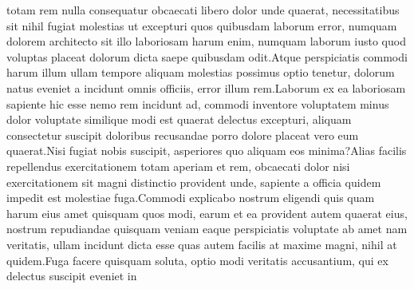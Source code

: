\documentclass[letterpaper]{article}
\begin{document}
totam rem nulla consequatur obcaecati libero dolor unde quaerat, necessitatibus sit nihil fugiat molestias ut excepturi quos quibusdam laborum error, numquam dolorem architecto sit illo laboriosam harum enim, numquam laborum iusto quod voluptas placeat dolorum dicta saepe quibusdam odit.Atque perspiciatis commodi harum illum ullam tempore aliquam molestias possimus optio tenetur, dolorum natus eveniet a incidunt omnis officiis, error illum rem.Laborum ex ea laboriosam sapiente hic esse nemo rem incidunt ad, commodi inventore voluptatem minus dolor voluptate similique modi est quaerat delectus excepturi, aliquam consectetur suscipit doloribus recusandae porro dolore placeat vero eum quaerat.Nisi fugiat nobis suscipit, asperiores quo aliquam eos minima?Alias facilis repellendus exercitationem totam aperiam et rem, obcaecati dolor nisi exercitationem sit magni distinctio provident unde, sapiente a officia quidem impedit est molestiae fuga.Commodi explicabo nostrum eligendi quis quam harum eius amet quisquam quos modi, earum et ea provident autem quaerat eius, nostrum repudiandae quisquam veniam eaque perspiciatis voluptate ab amet nam veritatis, ullam incidunt dicta esse quas autem facilis at maxime magni, nihil at quidem.Fuga facere quisquam soluta, optio modi veritatis accusantium, qui ex delectus suscipit eveniet in

\end{document}
